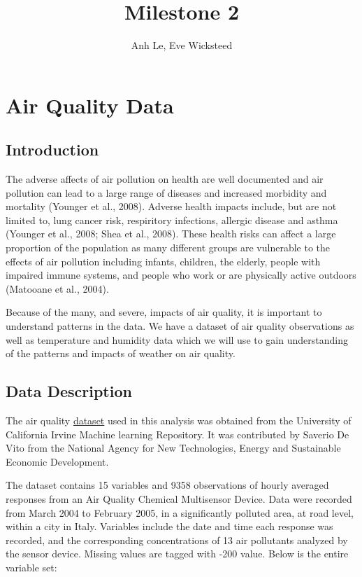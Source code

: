 \documentclass[]{article}
\title{Milestone 2}
\author{Anh Le, Eve Wicksteed}
\date{}
\begin{document}
\maketitle

\hypertarget{air-quality-data}{%
\section{Air Quality Data}\label{air-quality-data}}

\hypertarget{introduction}{%
\subsection{Introduction}\label{introduction}}

The adverse affects of air pollution on health are well documented and
air pollution can lead to a large range of diseases and increased
morbidity and mortality (Younger et al., 2008). Adverse health impacts
include, but are not limited to, lung cancer risk, respiritory
infections, allergic disease and asthma (Younger et al., 2008; Shea et
al., 2008). These health risks can affect a large proportion of the
population as many different groups are vulnerable to the effects of air
pollution including infants, children, the elderly, people with impaired
immune systems, and people who work or are physically active outdoors
(Matooane et al., 2004).

Because of the many, and severe, impacts of air quality, it is important
to understand patterns in the data. We have a dataset of air quality
observations as well as temperature and humidity data which we will use
to gain understanding of the patterns and impacts of weather on air
quality.

\hypertarget{data-description}{%
\subsection{Data Description}\label{data-description}}

The air quality
\href{https://archive.ics.uci.edu/ml/datasets/Air+Quality}{dataset} used
in this analysis was obtained from the University of California Irvine
Machine learning Repository. It was contributed by Saverio De Vito from
the National Agency for New Technologies, Energy and Sustainable
Economic Development.

The dataset contains 15 variables and 9358 observations of hourly
averaged responses from an Air Quality Chemical Multisensor Device. Data
were recorded from March 2004 to February 2005, in a significantly
polluted area, at road level, within a city in Italy. Variables include
the date and time each response was recorded, and the corresponding
concentrations of 13 air pollutants analyzed by the sensor device.
Missing values are tagged with -200 value. Below is the entire variable
set:
\end{document}
